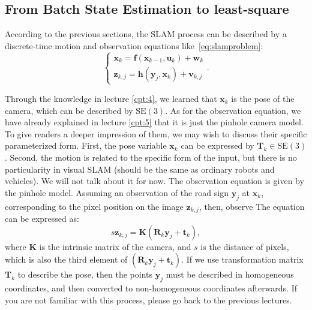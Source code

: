 \subsection{From Batch State Estimation to least-square}
According to the previous sections, the SLAM process can be described by a discrete-time motion and observation equations like~\eqref{eq:slamproblem}:
\begin{equation}
\left\{ \begin{array}{l}
{\mathbf{x}_k} = \mathbf{f}\left( {{\mathbf{x}_{k - 1}},{\mathbf{u}_k}} \right) + \mathbf{w}_k\\
{\mathbf{z}_{k,j}} = \mathbf{h}\left( {{ \mathbf{y}_j},{ \mathbf{x}_k}}  \right)+ \mathbf{v}_{k,j}
\end{array} \right. .
\end{equation}

Through the knowledge in lecture \ref{cpt:4}, we learned that $ \mathbf {x} _k $ is the pose of the camera, which can be described by $ \mathrm {SE} (3) $. As for the observation equation, we have already explained in lecture \ref{cpt:5} that it is just the pinhole camera model. To give readers a deeper impression of them, we may wish to discuss their specific parameterized form. First, the pose variable $\mathbf {x} _k $ can be expressed by $\mathbf {T} _k \in \mathrm {SE} (3) $. Second, the motion is related to the specific form of the input, but there is no particularity in visual SLAM (should be the same as ordinary robots and vehicles). We will not talk about it for now. The observation equation is given by the pinhole model. Assuming an observation of the road sign $ \mathbf {y} _j $ at $ \mathbf {x} _k $, corresponding to the pixel position on the image $ \mathbf {z} _ {k, j} $, then, observe The equation can be expressed as:
\begin{equation}
s \mathbf{z}_{k,j}= \mathbf{K} (\mathbf{R}_k {\mathbf{y}_j}+\mathbf{t}_k),
\end{equation}
where $ \mathbf {K} $ is the intrinsic matrix of the camera, and $s$ is the distance of pixels, which is also the third element of $ (\mathbf {R} _k {\mathbf {y} _j} + \mathbf {t} _k) $. If we use  transformation matrix $ \mathbf {T} _k $ to describe the pose, then the points $ \mathbf {y} _j $ must be described in homogeneous coordinates, and then converted to non-homogeneous coordinates afterwards. If you are not familiar with this process, please go back to the previous lectures.

